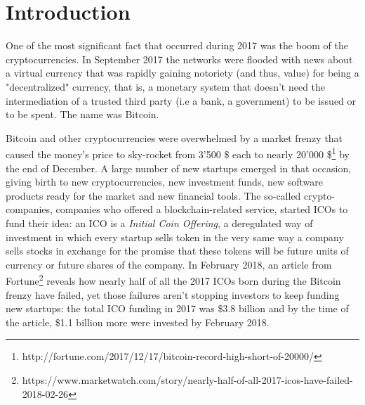 
	\chapter{Introduction}
		One of the most significant fact that occurred during 2017 was the boom of the cryptocurrencies. In September 2017 the networks were flooded with news about a virtual currency that was rapidly gaining notoriety (and thus, value) for being a "decentralized" currency, that is, a monetary system that doesn't need the intermediation of a trusted third party (i.e a bank, a government) to be issued or to be spent. The name was Bitcoin.
		
		Bitcoin and other cryptocurrencies were overwhelmed by a market frenzy that caused the money's price to sky-rocket from 3'500 \$ each to nearly 20'000 \$\footnote{http://fortune.com/2017/12/17/bitcoin-record-high-short-of-20000/} by the end of December. A large number of new startups emerged in that occasion, giving birth to new cryptocurrencies, new investment funds, new software products ready for the market and new financial tools. The so-called crypto-companies, companies who offered a blockchain-related service, started ICOs to fund their idea: an ICO is a \textit{Initial Coin Offering}, a deregulated way of investment in which every startup sells token in the very same way a company sells stocks in exchange for the promise that these tokens will be future units of currency or future shares of the company. In February 2018, an article from Fortune\footnote{https://www.marketwatch.com/story/nearly-half-of-all-2017-icos-have-failed-2018-02-26} reveals how nearly half of all the 2017 ICOs born during the Bitcoin frenzy have failed, yet those failures aren't stopping investors to keep funding new startups: the total ICO funding in 2017 was \$3.8 billion and by the time of the article, \$1.1 billion more were invested by February 2018.
		
